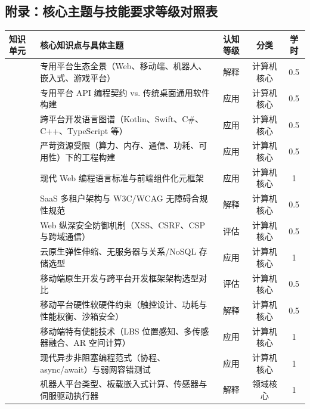 \begin{strip}
\section{附录：核心主题与技能要求等级对照表}

\begingroup
{}\renewcommand{\arraystretch}{0.90}\setlength{\tabcolsep}{3pt}
\noindent\begin{tabularx}{\textwidth}{p{} Y c c c}
\toprule
\textbf{知识单元} & \textbf{核心知识点与具体主题} & \textbf{认知等级} & \textbf{分类} & \textbf{学时} \\
\midrule
{} 
& 专用平台生态全景（Web、移动端、机器人、嵌入式、游戏平台） & 解释 & 计算机核心 & 0.5 \\
& 专用平台 API 编程契约 vs. 传统桌面通用软件构建 & 应用 & 计算机核心 & 0.5 \\
& 跨平台开发语言图谱（Kotlin、Swift、C\#、C++、TypeScript 等） & 应用 & 计算机核心 & 0.5 \\
& 严苛资源受限（算力、内存、通信、功耗、可用性）下的工程构建 & 应用 & 计算机核心 & 0.5 \\
\midrule
{} 
& 现代 Web 编程语言标准与前端组件化元框架 & 应用 & 计算机核心 & 1 \\
& SaaS 多租户架构与 W3C/WCAG 无障碍合规性规范 & 解释 & 计算机核心 & 0.5 \\
& Web 纵深安全防御机制（XSS、CSRF、CSP 与跨域通信） & 评估 & 计算机核心 & 0.5 \\
& 云原生弹性伸缩、无服务器与关系/NoSQL 存储选型 & 应用 & 计算机核心 & 1 \\
\midrule
{} 
& 移动端原生开发与跨平台开发框架架构选型对比 & 评估 & 计算机核心 & 0.5 \\
& 移动平台硬性软硬件约束（触控设计、功耗与性能权衡、沙箱安全） & 解释 & 计算机核心 & 0.5 \\
& 移动端特有使能技术（LBS 位置感知、多传感器融合、AR 空间计算） & 应用 & 计算机核心 & 1 \\
& 现代异步非阻塞编程范式（协程、async/await）与弱网容错测试 & 应用 & 计算机核心 & 1 \\
\midrule
{} 
& 机器人平台类型、板载嵌入式计算、传感器与伺服驱动执行器 & 解释 & 领域核心 & 1 \\

\end{tabularx}
\end{strip}
